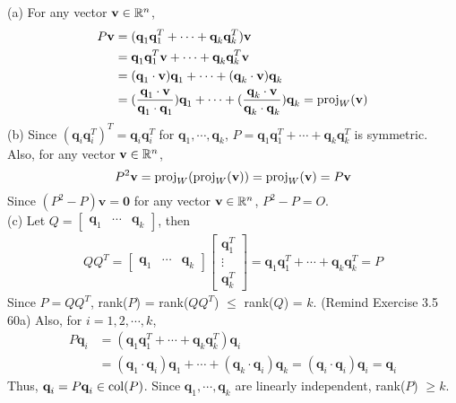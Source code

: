 (a) For any vector $\textbf{v} \in \mathbb{R}^{n}$, \begin{align*}
	P\textbf{v} &= (\textbf{q}_1\textbf{q}_1^T + \cdots + \textbf{q}_k\textbf{q}_k^T)\textbf{v} \\
	&= \textbf{q}_1\textbf{q}_1^T\textbf{v} + \cdots + \textbf{q}_k\textbf{q}_k^T\textbf{v} \\
	&= (\textbf{q}_1 \cdot \textbf{v})\textbf{q}_1 + \cdots + (\textbf{q}_k \cdot \textbf{v})\textbf{q}_k \\
	&= (\frac{\textbf{q}_1 \cdot \textbf{v}}{\textbf{q}_1 \cdot \textbf{q}_1})\textbf{q}_1 + \cdots + (\frac{\textbf{q}_k \cdot \textbf{v}}{\textbf{q}_k \cdot \textbf{q}_k})\textbf{q}_k = \textnormal{proj}_W(\textbf{v})
\end{align*}
(b) Since $(\textbf{q}_i\textbf{q}_i^T)^T = \textbf{q}_i\textbf{q}_i^T$ for $\textbf{q}_1, \cdots, \textbf{q}_k$, $P = \textbf{q}_1\textbf{q}_1^T + \cdots + \textbf{q}_k\textbf{q}_k^T$ is symmetric. Also, for any vector $\textbf{v} \in \mathbb{R}^{n}$, \begin{equation*}
	P^2\textbf{v} = \textnormal{proj}_W(\textnormal{proj}_W(\textbf{v})) = \textnormal{proj}_W(\textbf{v}) = P\textbf{v}
\end{equation*} Since $(P^2 - P)\textbf{v} = \textbf{0}$ for any vector $\textbf{v} \in \mathbb{R}^{n}$, $P^2  - P = O$. \\

(c) Let $Q = \begin{bmatrix}
	\textbf{q}_1 & \cdots & \textbf{q}_k
\end{bmatrix}$, then \begin{align*}
	QQ^T = \begin{bmatrix}
		\textbf{q}_1 & \cdots & \textbf{q}_k
	\end{bmatrix} \begin{bmatrix}
		\textbf{q}_1^T \\ \vdots \\ \textbf{q}_k^T
	\end{bmatrix} = \textbf{q}_1\textbf{q}_1^T + \cdots + \textbf{q}_k\textbf{q}_k^T = P
\end{align*}
Since $P = QQ^T$, rank($P$) = rank($QQ^T$) $\le$ rank($Q$) = $k$. (Remind Exercise 3.5 60a) Also, for $i = 1, 2, \cdots, k$, \begin{align*}
	P\textbf{q}_i &= (\textbf{q}_1\textbf{q}_1^T + \cdots + \textbf{q}_k\textbf{q}_k^T)\textbf{q}_i \\
	&= (\textbf{q}_1 \cdot \textbf{q}_i)\textbf{q}_1 + \cdots + (\textbf{q}_k \cdot \textbf{q}_i)\textbf{q}_k = (\textbf{q}_i \cdot \textbf{q}_i) \textbf{q}_i = \textbf{q}_i
\end{align*} Thus, $\textbf{q}_i = P\textbf{q}_i \in \textnormal{col}(P)$. Since $\textbf{q}_1, \cdots, \textbf{q}_k$ are linearly independent, rank($P$) $\ge k$. \\

